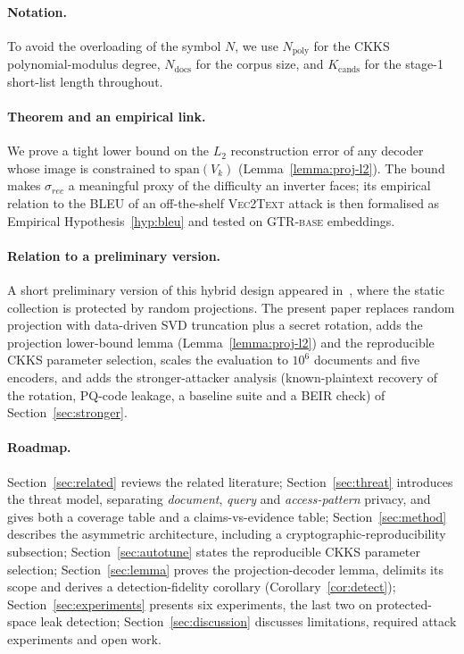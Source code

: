 \documentclass[11pt,a4paper]{article}
\begin{document}
\paragraph{Notation.} To avoid the overloading of the symbol $N$, we use
$N_{\mathrm{poly}}$ for the CKKS polynomial-modulus degree,
$N_{\mathrm{docs}}$ for the corpus size, and $K_{\mathrm{cands}}$ for the
stage-1 short-list length throughout.

\paragraph{Theorem and an empirical link.} We prove a tight lower bound on
the $L_2$ reconstruction error of any decoder whose image is constrained
to $\mathrm{span}(V_k)$ (Lemma~\ref{lemma:proj-l2}). The bound makes
$\sigma_{rec}$ a meaningful proxy of the difficulty an inverter faces;
its empirical relation to the BLEU of an off-the-shelf
\textsc{Vec2Text} attack is then formalised as Empirical
Hypothesis~\ref{hyp:bleu} and tested on \textsc{GTR-base} embeddings.

\paragraph{Relation to a preliminary version.} A short preliminary version
of this hybrid design appeared in~\cite{ref_vkit}, where the static
collection is protected by random projections. The present paper replaces
random projection with data-driven SVD truncation plus a secret rotation,
adds the projection lower-bound lemma (Lemma~\ref{lemma:proj-l2}) and the
reproducible CKKS parameter selection, scales the evaluation to $10^6$
documents and five encoders, and adds the stronger-attacker analysis
(known-plaintext recovery of the rotation, PQ-code leakage, a baseline
suite and a BEIR check) of Section~\ref{sec:stronger}.

\paragraph{Roadmap.} Section~\ref{sec:related} reviews the related
literature; Section~\ref{sec:threat} introduces the threat model,
separating \emph{document}, \emph{query} and \emph{access-pattern}
privacy, and gives both a coverage table and a claims-vs-evidence table;
Section~\ref{sec:method} describes the asymmetric architecture, including
a cryptographic-reproducibility subsection;
Section~\ref{sec:autotune} states the reproducible CKKS parameter selection;
Section~\ref{sec:lemma} proves the projection-decoder lemma,
delimits its scope and derives a detection-fidelity corollary
(Corollary~\ref{cor:detect}); Section~\ref{sec:experiments} presents six
experiments, the last two on protected-space leak detection; Section~\ref{sec:discussion} discusses limitations,
required attack experiments and open work.
\end{document}
